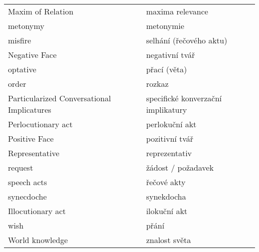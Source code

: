 \documentclass[a4paper,landscape,headrule,footrule,xetex]{foils}
\begin{document}
\begin{longtable}{ll}
Maxim of Relation & maxima relevance \\
metonymy & metonymie \\
misfire & selhání (řečového aktu) \\
Negative Face & negativní tvář \\
optative & přací (věta) \\
order & rozkaz \\
Particularized Conversational Implicatures & specifické konverzační implikatury \\
Perlocutionary act & perlokuční akt \\
Positive Face & pozitivní tvář \\
Representative & reprezentativ \\
request & žádost / požadavek \\
speech acts & řečové akty \\
synecdoche & synekdocha \\
Illocutionary act & ilokuční akt \\
wish & přání \\
World knowledge & znalost světa \\
\end{longtable}
\end{document}
